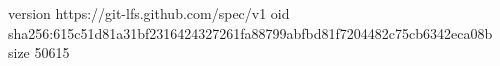 version https://git-lfs.github.com/spec/v1
oid sha256:615c51d81a31bf2316424327261fa88799abfbd81f7204482c75cb6342eca08b
size 50615
